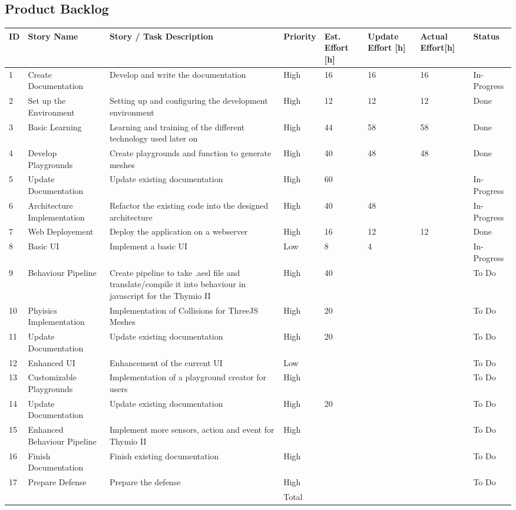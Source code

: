 \documentclass{scrartcl}
\begin{document}
\subsection{Product Backlog}
\begin{longtable}{p{5mm}|p{2cm}|p{4cm}|p{1cm}|p{1cm}|p{1cm}|p{1cm}|p{15mm}}
  ID                     & Story Name & Story / Task Description & Priority & Est. Effort {[}h{]} & Update Effort {[}h{]} & Actual Effort{[}h{]} & Status                \\ \hline
  1 & Create Documentation & Develop and write the documentation & High & 16 & 16 & 16 & In-Progress \\ 
  2 & Set up the Environment & Setting up and configuring the development environment & High & 12 & 12 & 12 & Done \\ 
  3 & Basic Learning & Learning and training of the different technology used later on & High & 44 & 58 & 58 & Done \\ 
  4 & Develop Playgrounds & Create playgrounds and function to generate meshes & High & 40 & 48 & 48 & Done \\ 
  5 & Update Documentation & Update existing documentation & High & 60 &  &  & In-Progress \\
  6 & Architecture Implementation & Refactor the existing code into the designed architecture & High & 40 & 48 &  & In-Progress\\ 
  7 & Web Deployement & Deploy the application on a webserver & High & 16 & 12 & 12 & Done \\ 
  8 & Basic UI & Implement a basic UI & Low & 8 & 4 &  & In-Progress \\ 
  9 & Behaviour Pipeline & Create pipeline to take .aesl file and translate/compile it into behaviour in javascript for the Thymio II & High & 40 &  &  & To Do \\ 
  10 & Phyisics Implementation & Implementation of Collisions for ThreeJS Meshes & High & 20 &  &  & To Do \\ 
  11 & Update Documentation & Update existing documentation & High & 20 &  &  & To Do \\ 
  12 & Enhanced UI & Enhancement of the current UI & Low &  &  &  & To Do \\ 
  13 & Customizable Playgrounds & Implementation of a playground creator for users & High &  &  &  & To Do \\ 
  14 & Update Documentation & Update existing documentation & High & 20 &  &  & To Do \\ 
  15 & Enhanced Behaviour Pipeline & Implement more sensors, action and event for Thymio II & High &  &  &  & To Do \\ 
  16 & Finish Documentation & Finish existing documentation & High &  &  &  & To Do \\
  17 & Prepare Defense & Prepare the defense & High &  &  &  & To Do \\ 
   &  &  & Total &  &  &  &  \\ 
\end{longtable}
\end{document}
